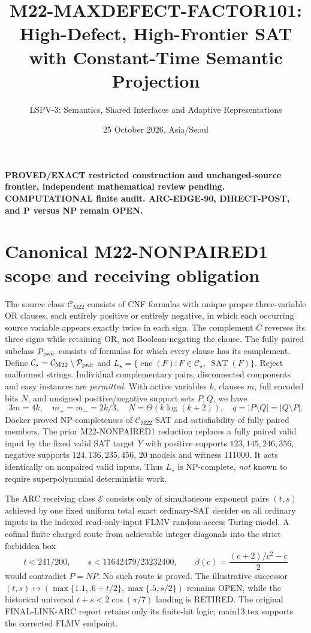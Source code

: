 \documentclass[11pt]{article}
\title{M22-MAXDEFECT-FACTOR101: High-Defect, High-Frontier SAT with Constant-Time Semantic Projection}
\author{LSPV-3: Semantics, Shared Interfaces and Adaptive Representations}
\date{25 October 2026, Asia/Seoul}
\newcommand{\CM}{\mathcal C_{\mathrm{M22}}}
\newcommand{\CS}{\mathcal C_\star}
\begin{document}
\maketitle
\begin{center}\textbf{PROVED/EXACT restricted construction and unchanged-source frontier, independent mathematical review pending. COMPUTATIONAL finite audit. ARC-EDGE-90, DIRECT-POST, and P versus NP remain OPEN.}\end{center}

\section{Canonical M22-NONPAIRED1 scope and receiving obligation}
The source class $\CM$ consists of CNF formulas with unique proper three-variable OR clauses, each entirely positive or entirely negative, in which each occurring source variable appears exactly twice in each sign. The complement $\bar C$ reverses its three signs while retaining OR, not Boolean-negating the clause. The fully paired subclass $\mathcal P_{\rm pair}$ consists of formulas for which every clause has its complement. Define $\CS=\CM\setminus\mathcal P_{\rm pair}$ and $L_\star=\{\operatorname{enc}(F):F\in\CS,\ \operatorname{SAT}(F)\}$. Reject malformed strings. Individual complementary pairs, disconnected components and easy instances are \emph{permitted}. With active variables $k$, clauses $m$, full encoded bits $N$, and unsigned positive/negative support sets $P,Q$, we have
\[
3m=4k,\quad m_+=m_-=2k/3,\quad N=\Theta(k\log(k+2)),\quad q=|P\setminus Q|=|Q\setminus P|.
\]
D\"ocker \cite{docker} proved NP-completeness of $\CM$-SAT and satisfiability of fully paired members. The prior M22-NONPAIRED1 reduction replaces a fully paired valid input by the fixed valid SAT target $Y$ with positive supports $123,145,246,356$, negative supports $124,136,235,456$, 20 models and witness 111000. It acts identically on nonpaired valid inputs. Thus $L_\star$ is NP-complete, \emph{not} known to require superpolynomial deterministic work.

The ARC receiving class $\mathcal E$ consists only of simultaneous exponent pairs $(t,s)$ achieved by one fixed uniform total exact ordinary-SAT decider on all ordinary inputs in the indexed read-only-input FLMV random-access Turing model. A cofinal finite charged route from achievable integer diagonals into the strict forbidden box
\[
t<241/200,\qquad s<11642479/23232400,\qquad
\beta(c)=\frac{(c+2)/c^2-c}{2}
\]
would contradict $P=NP$. No such route is proved. The illustrative successor $(t,s)\mapsto(\max\{1.1,.6+t/2\},\max\{.5,s/2\})$ remains OPEN, while the historical universal $t+s<2\cos(\pi/7)$ landing is RETIRED. The original FINAL-LINK-ARC report \cite{final} retains only its finite-hit logic; main13.tex \cite{main13} supports the corrected FLMV endpoint.
\end{document}
